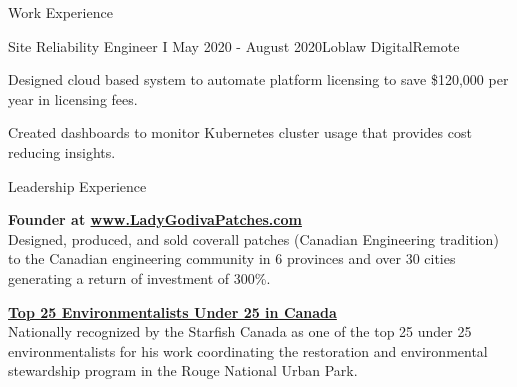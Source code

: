 \documentclass{resume} %
\begin{document}
\begin{rSection}{Work Experience}

\begin{rSubsection}{Site Reliability Engineer I }{May 2020 - August 2020}{Loblaw Digital}{Remote}
\item Designed cloud based system to automate platform licensing to save \$120,000 per year in licensing fees.
\item Created dashboards to monitor Kubernetes cluster usage that provides cost reducing insights.
\end{rSubsection}






\end{rSection}


\begin{rSection}{Leadership Experience}

{\bf Founder at \href{www.ladygodivapatches.com}{www.LadyGodivaPatches.com} } \\ 
Designed, produced, and sold coverall patches (Canadian Engineering tradition) to the Canadian engineering community in 6 provinces and over 30 cities generating a return of investment of 300\%.

{\bf \href{https://thestarfish.ca/journal/2018/06/2018-sftop25-finalist-sujeethan-vigneswaran-2}{Top 25 Environmentalists Under 25 in Canada}  } \\
Nationally recognized by the Starfish Canada as one of the top 25 under 25 environmentalists for his work coordinating the restoration and environmental stewardship program in the Rouge National Urban Park.

\end{rSection}
\end{document}
